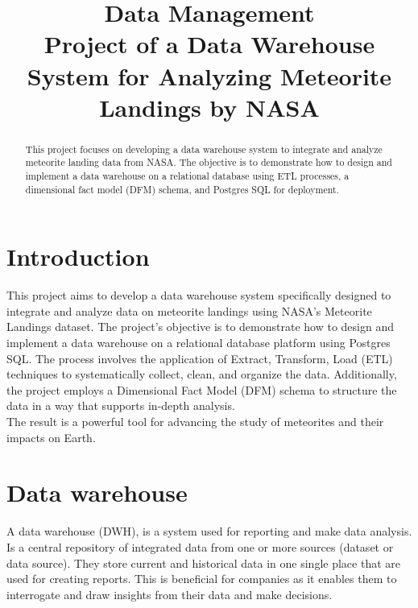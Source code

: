 \documentclass[conference]{IEEEtran}
\begin{document}
	
	\title{Data Management \\ Project of a Data Warehouse System for Analyzing Meteorite Landings by NASA}
	
	\author{
	}
	\maketitle
	
	\begin{abstract}
			This project focuses on developing a data warehouse system to integrate and analyze meteorite landing data from NASA. The objective is to demonstrate how to design and implement a data warehouse on a relational database using ETL processes, a dimensional fact model (DFM) schema, and Postgres SQL for deployment. 
	\end{abstract}
	
	\section{Introduction}
	
	This project aims to develop a data warehouse system specifically designed to integrate and analyze data on meteorite landings using NASA's Meteorite Landings dataset. The project’s objective is to demonstrate how to design and implement a data warehouse on a relational database platform using Postgres SQL. The process involves the application of Extract, Transform, Load (ETL) techniques to systematically collect, clean, and organize the data. Additionally, the project employs a Dimensional Fact Model (DFM) schema to structure the data in a way that supports in-depth analysis. \\ The result is a powerful tool for advancing the study of meteorites and their impacts on Earth.
	
	\section{Data warehouse}
	A data warehouse (DWH), is a system used for reporting and make data analysis. Is a central repository of integrated data from one or more sources (dataset or data source). They store current and historical data in one single place that are used for creating reports. This is beneficial for companies as it enables them to interrogate and draw insights from their data and make decisions.
\end{document}
